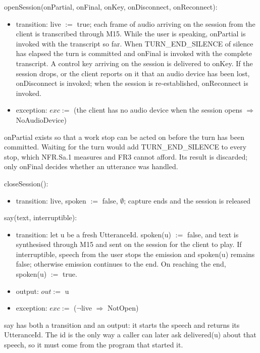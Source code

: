 \documentclass[12pt, titlepage]{article}
\begin{document}
\noindent openSession(onPartial, onFinal, onKey, onDisconnect, onReconnect):
\begin{itemize}
\item transition: live $:=$ true; each frame of audio arriving on the session
from the client is transcribed through M15. While the user is speaking,
onPartial is invoked with the transcript so far. When TURN\_END\_SILENCE of
silence has elapsed the turn is committed and onFinal is invoked with the
complete transcript. A control key arriving on the session is delivered to
onKey. If the session drops, or the client reports on it that an audio device
has been lost, onDisconnect is invoked; when the session is re-established,
onReconnect is invoked.
\item exception: $exc :=$ (the client has no audio device when the session
opens $\Rightarrow$ NoAudioDevice)
\end{itemize}

\noindent onPartial exists so that a work stop can be acted on before the turn
has been committed. Waiting for the turn would add TURN\_END\_SILENCE to every
stop, which NFR.Sa.1 measures and FR3 cannot afford. Its result is discarded;
only onFinal decides whether an utterance was handled.

\noindent closeSession():
\begin{itemize}
\item transition: live, spoken $:=$ false, $\emptyset$; capture ends and the
session is released
\end{itemize}

\noindent say(text, interruptible):
\begin{itemize}
\item transition: let u be a fresh UtteranceId. spoken(u) $:=$ false, and text
is synthesised through M15 and sent on the session for the client to play. If
interruptible, speech from
the user stops the emission and spoken(u) remains false; otherwise emission
continues to the end. On reaching the end, spoken(u) $:=$ true.
\item output: $out :=$ u
\item exception: $exc :=$ ($\lnot$live $\Rightarrow$ NotOpen)
\end{itemize}

\noindent say has both a transition and an output: it starts the speech and
returns its UtteranceId. The id is the only way a caller can later ask delivered(u)
about that speech, so it must come from the program that started it.
\end{document}
